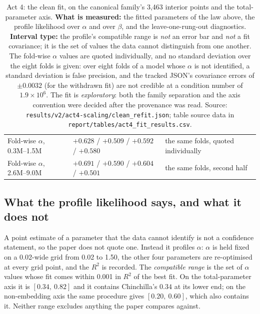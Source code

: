 \documentclass[11pt,a4paper]{article}
\begin{document}
\begin{table}[H]
\begin{tabular}{L{4.8cm}R{4.4cm}L{4.6cm}}
Fold-wise $\alpha$, 0.3M--1.5M & $+0.628$ / $+0.509$ / $+0.592$ / $+0.580$ & the same folds, quoted individually \\
Fold-wise $\alpha$, 2.6M--9.0M & $+0.691$ / $+0.590$ / $+0.604$ / $+0.501$ & the same folds, second half \\
\midrule
\end{tabular}
\caption{Act 4: the clean fit, on the canonical family's 3,463 interior points
and the total-parameter axis. \textbf{What is measured:} the fitted parameters
of the law above, the profile likelihood over $\alpha$ and over $\beta$, and
the leave-one-rung-out diagnostics. \textbf{Interval type:} the profile's
compatible range is \emph{not} an error bar and \emph{not} a fit covariance;
it is the set of values the data cannot distinguish from one another.
The fold-wise $\alpha$ values are quoted individually, and no standard
deviation over the eight folds is given: over eight folds of a model whose
$\alpha$ is not identified, a standard deviation is false precision, and the
tracked JSON's covariance errors of $\pm 0.0032$ (for the withdrawn fit) are
not credible at a condition number of $1.9\times10^{6}$. The fit is
\emph{exploratory}: both the family separation and the axis convention were
decided after the provenance was read. Source:
\texttt{results/v2/act4-scaling/clean\_refit.json}; table source data in
\texttt{report/tables/act4\_fit\_results.csv}.}
\label{tab:act4-fit}
\end{table}

\subsection{What the profile likelihood says, and what it does not}
\label{sec:act4-profile}

A point estimate of a parameter that the data cannot identify is not a
confidence statement, so the paper does not quote one. Instead it profiles
$\alpha$: $\alpha$ is held fixed on a 0.02-wide grid from 0.02 to 1.50, the
other four parameters are re-optimised at every grid point, and the $R^2$ is
recorded. The \emph{compatible range} is the set of $\alpha$ values whose fit
comes within 0.001 in $R^2$ of the best fit. On the total-parameter axis it
is $[0.34,\ 0.82]$ and it contains Chinchilla's $0.34$ at its lower end; on
the non-embedding axis the same procedure gives $[0.20,\ 0.60]$, which also
contains it. Neither range excludes anything the paper compares against.
\end{document}
